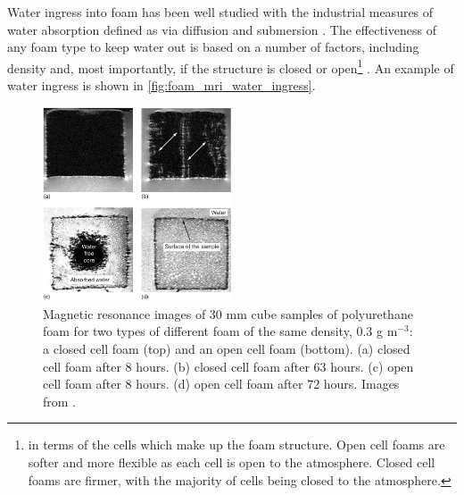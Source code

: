 

\par
Water ingress into foam has been well studied  with the industrial measures of water absorption defined as via diffusion and submersion \cite{foam_with_water_ref}.
The effectiveness of any foam type to keep water out is based on a number of factors, including density and, most importantly, if the structure is closed or open\footnote{in terms of the cells which make up the foam structure. Open cell foams are softer and more flexible as each cell is open to the atmosphere. Closed cell foams are firmer, with the majority of cells being closed to the atmosphere.} \cite{mechanical_properties_of_foam_ref}.
An example of water ingress is shown in \autoref{fig:foam_mri_water_ingress}.


\begin{figure}[]
\includegraphics[width=0.5\textwidth]{Figures/NeutronCaptureTime/foam_water_absorption.png}
\centering
\caption{Magnetic resonance images of 30 mm cube samples of polyurethane foam for two types of different foam of the same density, 0.3 g m${}^{-3}$: a closed cell foam (top) and an open cell foam (bottom).
(a) closed cell foam after 8 hours. (b) closed cell foam after 63 hours.
(c) open cell foam after 8 hours. (d) open cell foam after 72 hours.
Images from \cite{foam_mri_data_ref}.
}
\label{fig:foam_mri_water_ingress}
\end{figure}


